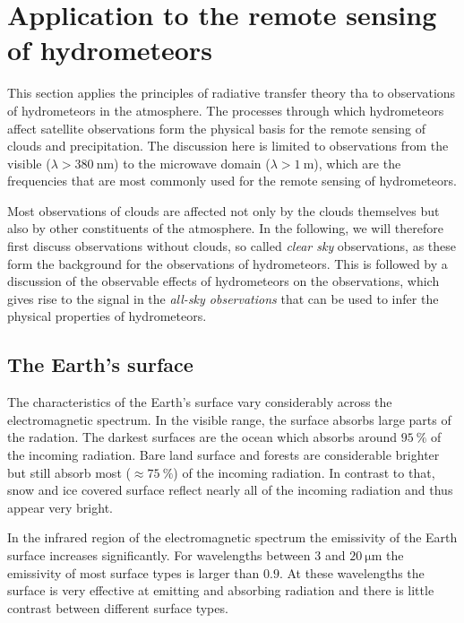 \section{Application to the remote sensing of hydrometeors}

This section applies the principles of radiative transfer theory tha to
observations of hydrometeors in the atmosphere. The processes through which
hydrometeors affect satellite observations form the physical basis for the
remote sensing of clouds and precipitation. The discussion here is limited to
observations from the visible ($\lambda > \SI{380}{\nano \meter}$) to the
microwave domain ($\lambda > \SI{1}{\meter}$), which are the frequencies
that are most commonly used for the remote sensing of hydrometeors.

Most observations of clouds are affected not only by the clouds themselves but
also by other constituents of the atmosphere. In the following, we will
therefore first discuss observations without clouds, so called \textit{clear
  sky} observations, as these form the background for the observations of
hydrometeors. This is followed by a discussion of the observable effects of
hydrometeors on the observations, which gives rise to the signal in the
\textit{all-sky observations} that can be used to infer the physical properties
of hydrometeors.

\subsection{The Earth's surface}

The characteristics of the Earth's surface vary considerably across the
electromagnetic spectrum. In the visible range, the surface absorbs large parts
of the radation. The darkest surfaces are the ocean which absorbs around
$\SI{95}{\percent}$ of the incoming radiation. Bare land surface and forests are
considerable brighter but still absorb most ($\approx \SI{75}{\percent}$) of the
incoming radiation. In contrast to that, snow and ice covered surface reflect
nearly all of the incoming radiation and thus appear very bright.

In the infrared region of the electromagnetic spectrum the emissivity of the Earth surface
increases significantly. For wavelengths between $3$ and $\SI{20}{\micro \meter}$ the emissivity
of most surface types is larger than $0.9$. At these wavelengths the surface is very effective at
emitting and absorbing radiation and there is little contrast between different surface types.


